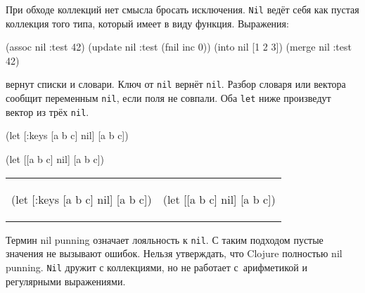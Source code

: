 При обходе коллекций нет смысла бросать исключения. \verb|Nil| ведёт себя как
пустая коллекция того типа, который имеет в виду функция. Выражения:

\begin{english}
  \begin{clojure}
(assoc nil :test 42)
(update nil :test (fnil inc 0))
(into nil [1 2 3])
(merge nil {:test 42})
  \end{clojure}
\end{english}

\noindent
вернут списки и словари. Ключ от \verb|nil| вернёт \verb|nil|. Разбор
словаря или вектора сообщит переменным \verb|nil|, если поля не совпали. Оба
\verb|let| ниже произведут вектор из трёх \verb|nil|.

\ifx\DEVICETYPE\MOBILE

\begin{english}
  \begin{clojure}
(let [{:keys [a b c]} nil]
  [a b c])
  \end{clojure}

\splitter

  \begin{clojure}
(let [[a b c] nil]
  [a b c])
  \end{clojure}
\end{english}

\else

\begin{english}
\noindent
\begin{tabular}{ @{}p{5cm} @{}p{5cm} }

  \begin{clojure}
(let [{:keys [a b c]} nil]
  [a b c])
  \end{clojure}

&

  \begin{clojure}
(let [[a b c] nil]
  [a b c])
  \end{clojure}

\end{tabular}

\end{english}

\fi


Термин nil punning означает лояльность к \verb|nil|. С таким подходом
пустые значения не вызывают ошибок. Нельзя утверждать, что Clojure полностью
nil punning. \verb|Nil| дружит с коллекциями, но не работает с~арифметикой
и регулярными выражениями.

